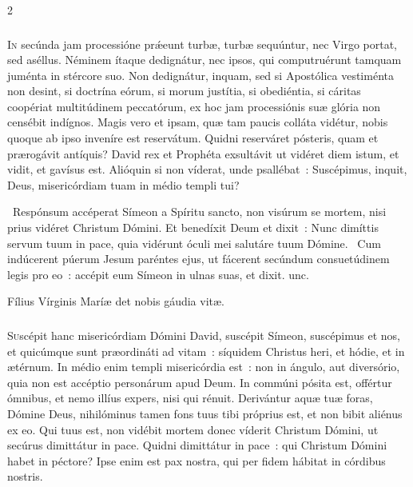 \documentclass[9pt,twoside]{extarticle}
\begin{document}
\begin{multicols}{2}
\subsubsection*{\center{}}
\lettrine{I}n secúnda jam processióne prǽeunt turbæ, turbæ sequúntur, nec Virgo portat, sed aséllus. Néminem ítaque dedignátur, nec ipsos, qui computruérunt tamquam juménta in stércore suo. Non dedignátur, inquam, sed si Apostólica vestiménta non desint, si doctrína eórum, si morum justítia, si obediéntia, si cáritas coopériat multitúdinem peccatórum, ex hoc jam processiónis suæ glória non censébit indígnos. Magis vero et ipsam, quæ tam paucis colláta vidétur, nobis quoque ab ipso inveníre est reservátum. Quidni reserváret pósteris, quam et prærogávit antíquis? David rex et Prophéta exsultávit ut vidéret diem istum, et vidit, et gavísus est. Alióquin si non víderat, unde psallébat~: Suscépimus, inquit, Deus, misericórdiam tuam in médio templi tui?

\begin{tightlist}{}
\item {}~Respónsum accéperat Símeon a Spíritu sancto, non visúrum se mortem, nisi prius vidéret Christum Dómini. Et benedíxit Deum et dixit~: \textred{*} Nunc dimíttis servum tuum in pace, quia vidérunt óculi mei salutáre tuum Dómine. ~Cum indúcerent púerum Jesum paréntes ejus, ut fácerent secúndum consuetúdinem legis pro eo~: accépit eum Símeon in ulnas suas, et dixit. unc.
\item {\small {} Fílius Vírginis Maríæ det nobis gáudia vitæ.}
\end{tightlist}

\subsubsection*{\center{}}
\lettrine{S}uscépit hanc misericórdiam Dómini David, suscépit Símeon, suscépimus et nos, et quicúmque sunt præordináti ad vitam~: síquidem Christus heri, et hódie, et in ætérnum. In médio enim templi misericórdia est~: non in ángulo, aut diversório, quia non est accéptio personárum apud Deum. In commúni pósita est, offértur ómnibus, et nemo illíus expers, nisi qui rénuit. Derivántur aquæ tuæ foras, Dómine Deus, nihilóminus tamen fons tuus tibi próprius est, et non bibit aliénus ex eo. Qui tuus est, non vidébit mortem donec víderit Christum Dómini, ut secúrus dimittátur in pace. Quidni dimittátur in pace~: qui Christum Dómini habet in péctore? Ipse enim est pax nostra, qui per fidem hábitat in córdibus nostris.


\end{multicols}
\end{document}
